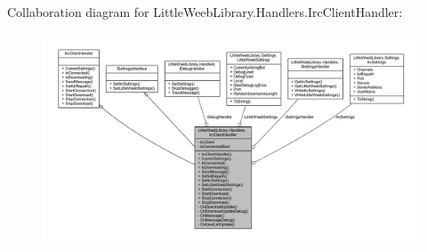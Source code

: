 Collaboration diagram for Little\+Weeb\+Library.\+Handlers.\+Irc\+Client\+Handler\+:\nopagebreak
\begin{figure}[H]
\begin{center}
\leavevmode
\includegraphics[width=350pt]{class_little_weeb_library_1_1_handlers_1_1_irc_client_handler__coll__graph}
\end{center}
\end{figure}
